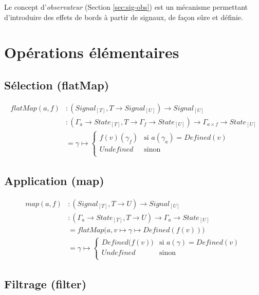 Le concept d'\emph{observateur} (Section \ref{sec:sig-obs}) est un mécanisme permettant d'introduire des effets de bords à partir de signaux, de façon sûre et définie.

\section{Opérations élémentaires}

	\subsection{Sélection (flatMap)}
		
		\begin{align*}
			flatMap(a, f)
				&\colon (Signal_{[T]}, T \to Signal_{[U]}) \to Signal_{[U]} \\
				&\colon (\Gamma_a \to State_{[T]}, T \to \Gamma_f \to State_{[U]}) \to \Gamma_{a \times f} \to State_{[U]} \\
				&= \gamma \mapsto \begin{cases}
					f(v)(\gamma_f) & \text{si } a(\gamma_a) = Defined(v)\\
					Undefined & \text{sinon}\\
				\end{cases}
		\end{align*}
	
	\subsection{Application (map)}
		
		\begin{align*}
			map(a, f)
				&\colon (Signal_{[T]}, T \to U) \to Signal_{[U]} \\
				&\colon (\Gamma_a \to State_{[T]}, T \to U) \to \Gamma_a \to State_{[U]} \\
				&= flatMap \big( a, v \mapsto \gamma \mapsto Defined(f(v)) \big)\\
				&= \gamma \mapsto \begin{cases}
					Defined \big(f (v) \big) & \text{si } a(\gamma) = Defined(v)\\
					Undefined & \text{sinon}\\
				\end{cases}
		\end{align*}
	
	\subsection{Filtrage (filter)}
	

